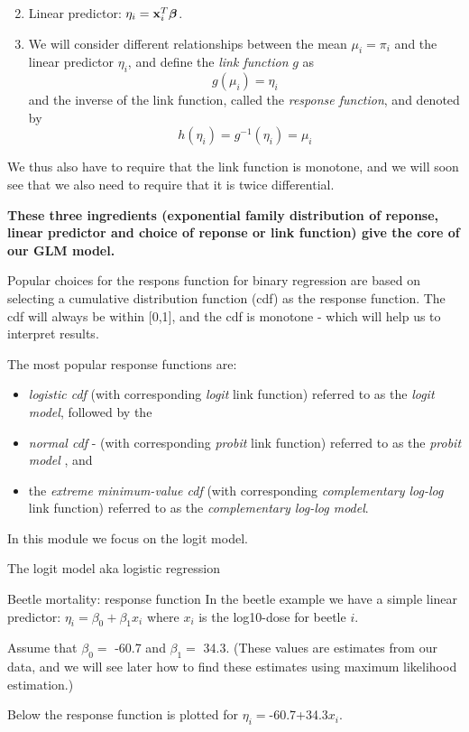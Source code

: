 \documentclass[
  ignorenonframetext,
]{beamer}
\begin{document}
\begin{frame}
\begin{enumerate}
\setcounter{enumi}{1}
\item
  Linear predictor: \(\eta_i={\bf x}_i^T \boldsymbol{\beta}\).
\item
  We will consider different relationships between the mean
  \(\mu_i=\pi_i\) and the linear predictor \(\eta_i\), and define the
  \emph{link function} \(g\) as \[g(\mu_i)=\eta_i\] and the inverse of
  the link function, called the \emph{response function}, and denoted by
  \[h(\eta_i)=g^{-1}(\eta_i)=\mu_i\]
\end{enumerate}

We thus also have to require that the link function is monotone, and we
will soon see that we also need to require that it is twice
differential.

\textbf{These three ingredients (exponential family distribution of
reponse, linear predictor and choice of reponse or link function) give
the core of our GLM model.}
\end{frame}

\begin{frame}
Popular choices for the respons function for binary regression are based
on selecting a cumulative distribution function (cdf) as the response
function. The cdf will always be within {[}0,1{]}, and the cdf is
monotone - which will help us to interpret results.

The most popular response functions are:

\begin{itemize}
\item
  \emph{logistic cdf} (with corresponding \emph{logit} link function)
  referred to as the \emph{logit model}, followed by the
\item
  \emph{normal cdf} - (with corresponding \emph{probit} link function)
  referred to as the \emph{probit model} , and
\item
  the \emph{extreme minimum-value cdf} (with corresponding
  \emph{complementary log-log} link function) referred to as the
  \emph{complementary log-log model}.
\end{itemize}

In this module we focus on the logit model.
\end{frame}

\begin{frame}{The logit model aka logistic regression}
\protect\hypertarget{the-logit-model-aka-logistic-regression}{}
\begin{block}{Beetle mortality: response function}
\protect\hypertarget{beetle-mortality-response-function}{}
In the beetle example we have a simple linear predictor:
\(\eta_i=\beta_0+\beta_1 x_i\) where \(x_i\) is the log10-dose for
beetle \(i\).

Assume that \(\beta_0=\) -60.7 and \(\beta_1=\) 34.3. (These values are
estimates from our data, and we will see later how to find these
estimates using maximum likelihood estimation.)

Below the response function is plotted for \(\eta_i=\)-60.7+34.3\(x_i\).
\end{block}
\end{frame}
\end{document}
